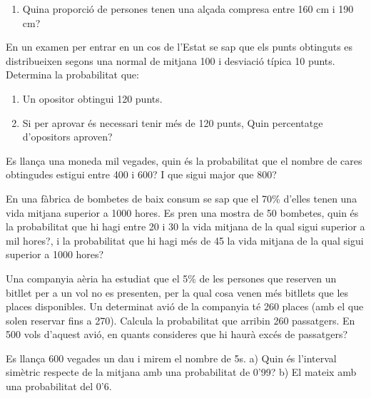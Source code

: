 \begin{mylist}
\begin{enumerate}
\item  Quina proporció de persones tenen una alçada compresa entre 160 cm i
190 cm?
\end{enumerate}
 
\item
En un examen per entrar en un cos de l'Estat se sap que els punts
obtinguts es distribueixen segons una normal de mitjana 100 i
desviació típica 10 punts. Determina la probabilitat que:

\begin{enumerate}
\item Un opositor obtingui 120 punts.

\item Si per aprovar és necessari tenir més de 120 punts, Quin percentatge
d'opositors aproven?
\end{enumerate}
 
\item
Es llança una moneda mil vegades, quin és la probabilitat que el
nombre de cares obtingudes estigui entre 400 i 600? I que sigui major
que 800?
\item
En una fàbrica de bombetes de baix consum se sap que el 70\% d'elles
tenen una vida mitjana superior a 1000 hores. Es pren una mostra de 50
bombetes, quin és la probabilitat que hi hagi entre 20 i 30 la vida
mitjana de la qual sigui superior a mil hores?, i la probabilitat que
hi hagi més de 45 la vida mitjana de la qual sigui superior a 1000
hores? 

\item
Una companyia aèria ha estudiat que el 5\% de les persones que
reserven un bitllet per a un vol no es presenten, per la qual cosa
venen més bitllets que les places disponibles. Un determinat avió de
la companyia té 260 places (amb el que solen reservar fins a 270).
Calcula la probabilitat que arribin 260 passatgers. En 500 vols
d'aquest avió, en quants consideres que hi haurà excés de passatgers? 

\item
Es llança 600 vegades un dau i mirem el nombre de 5s. a) Quin és
l'interval simètric respecte de la mitjana amb una probabilitat de
0'99? b) El mateix amb una probabilitat del 0'6. 
 
\end{mylist}


\newpage
\resum

